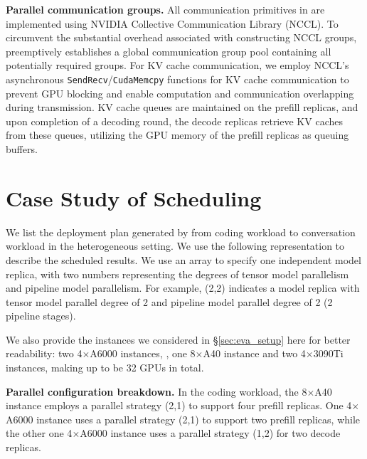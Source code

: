 \textbf{Parallel communication groups.} All communication primitives in \sys are implemented using NVIDIA Collective Communication Library (NCCL). To circumvent the substantial overhead associated with constructing NCCL groups, \sys preemptively establishes a global communication group pool containing all potentially required groups. For KV cache communication, we employ NCCL's asynchronous \texttt{SendRecv}/\texttt{CudaMemcpy} functions for KV cache communication to prevent GPU blocking and enable computation and communication overlapping during transmission. KV cache queues are maintained on the prefill replicas, and upon completion of a decoding round, the decode replicas retrieve KV caches from these queues, utilizing the GPU memory of the prefill replicas as queuing buffers.

\section{Case Study of Scheduling}
\label{appendix:scheduling_results}
We list the deployment plan generated by \sys from coding workload to conversation workload in the heterogeneous setting. We use the following representation to describe the scheduled results. We use an array to specify one independent model replica, with two numbers representing the degrees of tensor model parallelism and pipeline model parallelism. For example, (2,2) indicates a model replica with tensor model parallel degree of 2 and pipeline model parallel degree of 2 (2 pipeline stages).

We also provide the instances we considered in \S\ref{sec:eva_setup} here for better readability: two 4$\times$A6000 instances, , one 8$\times$A40 instance and two 4$\times$3090Ti instances, making up to be 32 GPUs in total.


\noindent \textbf{Parallel configuration breakdown.} In the coding workload, the 8$\times$A40 instance employs a parallel strategy (2,1) to support four prefill replicas. One 4$\times$A6000 instance uses a parallel strategy (2,1) to support two prefill replicas, while the other one 4$\times$A6000 instance uses a parallel strategy (1,2) for two decode replicas. 

